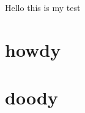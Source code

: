 \documentclass[12pt,a4paper]{article}
\begin{document}
\maketitle
Hello this is my test
\section{howdy}

\section{doody}
\end{document}
